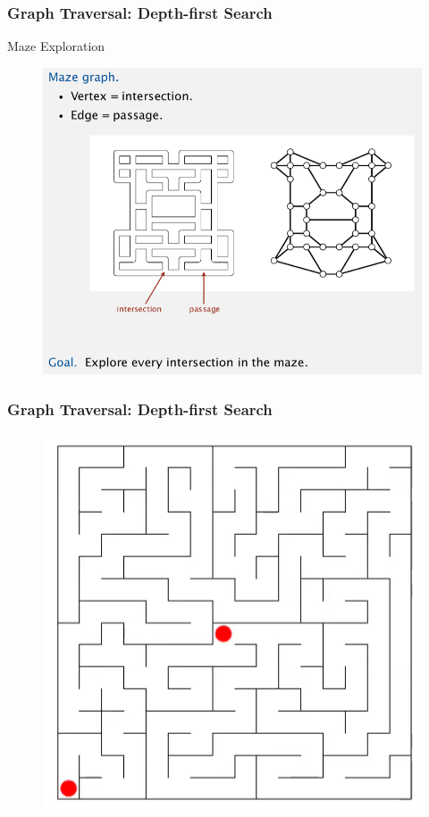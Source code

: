 \documentclass[11pt]{beamer}
\begin{document}
\begin{frame}
	\frametitle	{Graph Traversal: Depth-first Search} 
     \alert{Maze Exploration}
     \begin{figure}
     	\centering
     	\includegraphics[width=0.8\linewidth]{"Screenshot 2020-12-01 at 6.10.23 AM"}
     	\label{fig:screenshot-2020-12-01-at-6}
     \end{figure}    
\end{frame}

\begin{frame}
	\frametitle	{Graph Traversal: Depth-first Search} 
    \begin{figure}
    	\centering
    	\includegraphics[width=0.7\linewidth]{"Screenshot 2020-12-01 at 6.12.06 AM"}
    	\label{fig:screenshot-2020-12-01-at-6}
    \end{figure}    
\end{frame}
\end{document}

